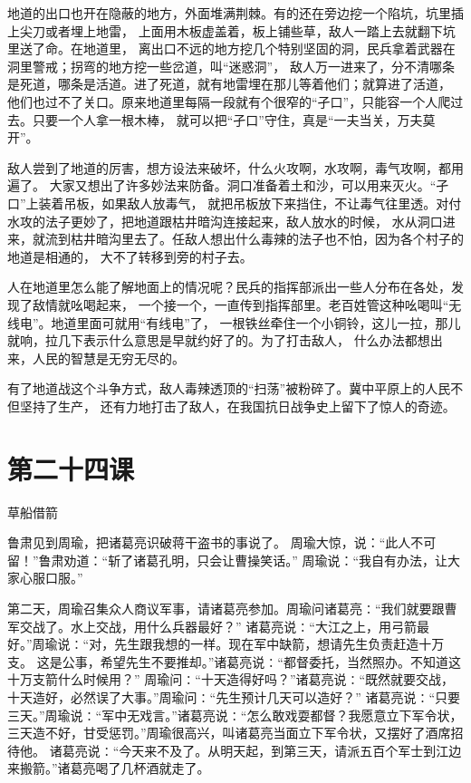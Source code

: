 \documentclass[12pt,UTF8]{ctexbook}
\begin{document}
地道的出口也开在隐蔽的地方，外面堆满荆棘。有的还在旁边挖一个陷坑，坑里插上尖刀或者埋上地雷，
上面用木板虚盖着，板上铺些草，敌人一踏上去就翻下坑里送了命。在地道里，
离出口不远的地方挖几个特别坚固的洞，民兵拿着武器在洞里警戒；拐弯的地方挖一些岔道，叫“迷惑洞”，
敌人万一进来了，分不清哪条是死道，哪条是活道。进了死道，就有地雷埋在那儿等着他们；就算进了活道，
他们也过不了关口。原来地道里每隔一段就有个很窄的“孑口”，只能容一个人爬过去。只要一个人拿一根木棒，
就可以把“孑口”守住，真是“一夫当关，万夫莫开”。

敌人尝到了地道的厉害，想方设法来破坏，什么火攻啊，水攻啊，毒气攻啊，都用遍了。
大家又想出了许多妙法来防备。洞口准备着土和沙，可以用来灭火。“孑口”上装着吊板，如果敌人放毒气，
就把吊板放下来挡住，不让毒气往里透。对付水攻的法子更妙了，把地道跟枯井暗沟连接起来，敌人放水的时候，
水从洞口进来，就流到枯井暗沟里去了。任敌人想出什么毒辣的法子也不怕，因为各个村子的地道是相通的，
大不了转移到旁的村子去。

人在地道里怎么能了解地面上的情况呢？民兵的指挥部派出一些人分布在各处，发现了敌情就吆喝起来，
一个接一个，一直传到指挥部里。老百姓管这种吆喝叫“无线电”。地道里面可就用“有线电”了，
一根铁丝牵住一个小铜铃，这儿一拉，那儿就响，拉几下表示什么意思是早就约好了的。为了打击敌人，
什么办法都想出来，人民的智慧是无穷无尽的。

有了地道战这个斗争方式，敌人毒辣透顶的“扫荡”被粉碎了。冀中平原上的人民不但坚持了生产，
还有力地打击了敌人，在我国抗日战争史上留下了惊人的奇迹。

\section{第二十四课}

草船借箭

鲁肃见到周瑜，把诸葛亮识破蒋干盗书的事说了。
周瑜大惊，说：“此人不可留！”鲁肃劝道：“斩了诸葛孔明，只会让曹操笑话。”
周瑜说：“我自有办法，让大家心服口服。”

第二天，周瑜召集众人商议军事，请诸葛亮参加。周瑜问诸葛亮∶“我们就要跟曹军交战了。水上交战，用什么兵器最好？”
诸葛亮说∶“大江之上，用弓箭最好。”周瑜说∶“对，先生跟我想的一样。现在军中缺箭，想请先生负责赶造十万支。
这是公事，希望先生不要推却。”诸葛亮说∶“都督委托，当然照办。不知道这十万支箭什么时候用？”
周瑜问∶“十天造得好吗？”诸葛亮说∶“既然就要交战，十天造好，必然误了大事。”周瑜问∶“先生预计几天可以造好？”
诸葛亮说∶“只要三天。”周瑜说∶“军中无戏言。”诸葛亮说∶“怎么敢戏耍都督？我愿意立下军令状，
三天造不好，甘受惩罚。”周瑜很高兴，叫诸葛亮当面立下军令状，又摆好了酒席招待他。
诸葛亮说∶“今天来不及了。从明天起，到第三天，请派五百个军士到江边来搬箭。”诸葛亮喝了几杯酒就走了。
\end{document}
